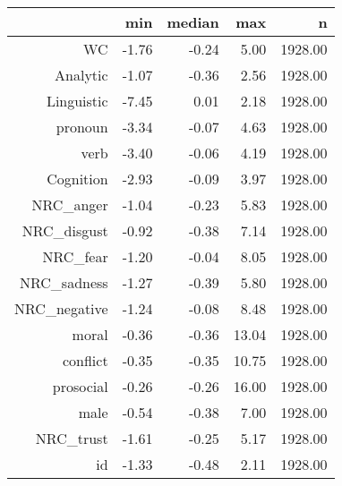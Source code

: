 \begin{table}[ht]
\centering
\begin{tabular}{rrrrr}
  \hline
 & min & median & max & n \\ 
  \hline
WC & -1.76 & -0.24 & 5.00 & 1928.00 \\ 
  Analytic & -1.07 & -0.36 & 2.56 & 1928.00 \\ 
  Linguistic & -7.45 & 0.01 & 2.18 & 1928.00 \\ 
  pronoun & -3.34 & -0.07 & 4.63 & 1928.00 \\ 
  verb & -3.40 & -0.06 & 4.19 & 1928.00 \\ 
  Cognition & -2.93 & -0.09 & 3.97 & 1928.00 \\ 
  NRC\_anger & -1.04 & -0.23 & 5.83 & 1928.00 \\ 
  NRC\_disgust & -0.92 & -0.38 & 7.14 & 1928.00 \\ 
  NRC\_fear & -1.20 & -0.04 & 8.05 & 1928.00 \\ 
  NRC\_sadness & -1.27 & -0.39 & 5.80 & 1928.00 \\ 
  NRC\_negative & -1.24 & -0.08 & 8.48 & 1928.00 \\ 
  moral & -0.36 & -0.36 & 13.04 & 1928.00 \\ 
  conflict & -0.35 & -0.35 & 10.75 & 1928.00 \\ 
  prosocial & -0.26 & -0.26 & 16.00 & 1928.00 \\ 
  male & -0.54 & -0.38 & 7.00 & 1928.00 \\ 
  NRC\_trust & -1.61 & -0.25 & 5.17 & 1928.00 \\ 
  id & -1.33 & -0.48 & 2.11 & 1928.00 \\ 
   \hline
\end{tabular}
\end{table}
